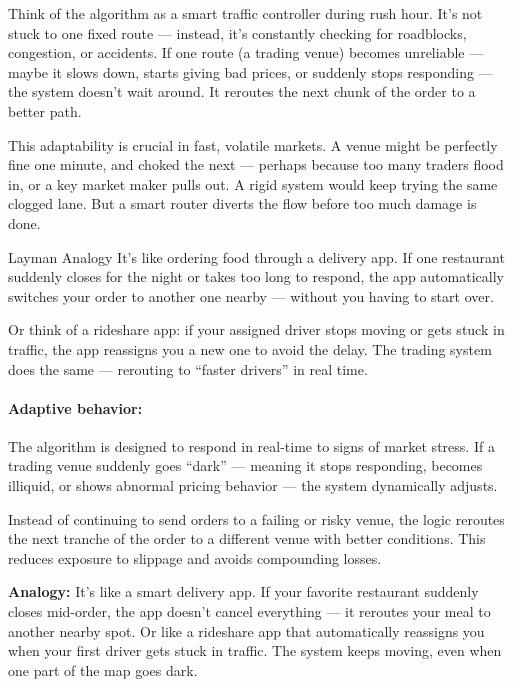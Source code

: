   Think of the algorithm as a smart traffic controller during rush hour. It's not stuck to one fixed route — instead, it's constantly checking for roadblocks, congestion, or accidents. If one route (a trading venue) becomes unreliable — maybe it slows down, starts giving bad prices, or suddenly stops responding — the system doesn't wait around. It reroutes the next chunk of the order to a better path.
  
  This adaptability is crucial in fast, volatile markets. A venue might be perfectly fine one minute, and choked the next — perhaps because too many traders flood in, or a key market maker pulls out. A rigid system would keep trying the same clogged lane. But a smart router diverts the flow before too much damage is done.
  
  Layman Analogy
  It’s like ordering food through a delivery app. If one restaurant suddenly closes for the night or takes too long to respond, the app automatically switches your order to another one nearby — without you having to start over.
  
  Or think of a rideshare app: if your assigned driver stops moving or gets stuck in traffic, the app reassigns you a new one to avoid the delay. The trading system does the same — rerouting to “faster drivers” in real time.

  \paragraph{Adaptive behavior:} 
  The algorithm is designed to respond in real-time to signs of market stress. If a trading venue suddenly goes “dark” — meaning it stops responding, becomes illiquid, or shows abnormal pricing behavior — the system dynamically adjusts.
  
  Instead of continuing to send orders to a failing or risky venue, the logic reroutes the next tranche of the order to a different venue with better conditions. This reduces exposure to slippage and avoids compounding losses.
  
  \textbf{Analogy:} 
  It's like a smart delivery app. If your favorite restaurant suddenly closes mid-order, the app doesn’t cancel everything — it reroutes your meal to another nearby spot. Or like a rideshare app that automatically reassigns you when your first driver gets stuck in traffic. The system keeps moving, even when one part of the map goes dark.
  










